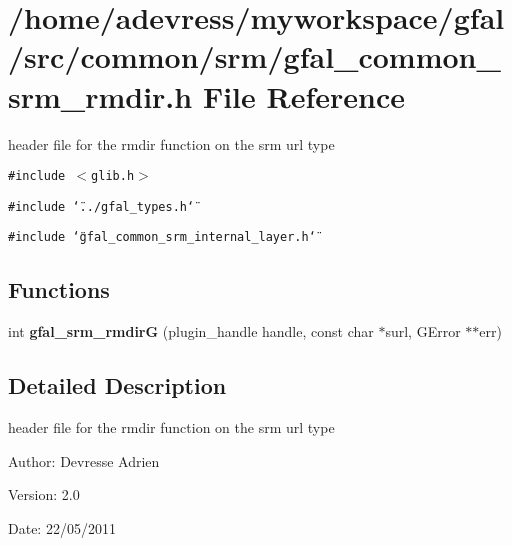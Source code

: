\section{/home/adevress/myworkspace/gfal/src/common/srm/gfal\_\-common\_\-srm\_\-rmdir.h File Reference}
\label{gfal__common__srm__rmdir_8h}
header file for the rmdir function on the srm url type 

{\tt \#include $<$glib.h$>$}\par
{\tt \#include \char`\"{}../gfal\_\-types.h\char`\"{}}\par
{\tt \#include \char`\"{}gfal\_\-common\_\-srm\_\-internal\_\-layer.h\char`\"{}}\par
\subsection*{Functions}
\begin{CompactItemize}
\item 
int \textbf{gfal\_\-srm\_\-rmdir\-G} (plugin\_\-handle handle, const char $\ast$surl, GError $\ast$$\ast$err)\label{gfal__common__srm__rmdir_8h_ac5dd038fc8d96e74279ba989e7ee19b}

\end{CompactItemize}


\subsection{Detailed Description}
header file for the rmdir function on the srm url type 

\begin{Desc}
\item[Author:]Devresse Adrien \end{Desc}
\begin{Desc}
\item[Version:]2.0 \end{Desc}
\begin{Desc}
\item[Date:]22/05/2011 \end{Desc}
